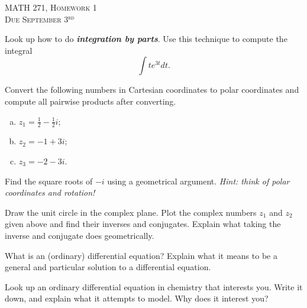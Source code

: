 \documentclass[12pt]{article} %
\begin{document}
\begin{center}
   \textsc{\large MATH 271, Homework 1}\\
   \textsc{Due September 3$^\textrm{rd}$}
\end{center}
\vspace{.5cm}

\begin{problem}
    Look up how to do \textbf{\emph{integration by parts}}. Use this technique to compute the integral
    \[
        \int t e^{3t}dt.
    \]
    
\end{problem}

\begin{problem}
Convert the following numbers in Cartesian coordinates to polar coordinates and compute all pairwise products after converting.
\begin{enumerate}[(a)]
    \item $z_1=\frac{1}{2}-\frac{1}{2}i$;
    \item $z_2=-1+3i$;
    \item $z_3=-2-3i$.
\end{enumerate}
\end{problem}

\begin{problem}
Find the square roots of $-i$ using a geometrical argument. \emph{Hint: think of polar coordinates and rotation!}
\end{problem}

\begin{problem}
Draw the unit circle in the complex plane. Plot the complex numbers $z_1$ and $z_2$ given above and find their inverses and conjugates. Explain what taking the inverse and conjugate does geometrically.
\end{problem}

\begin{problem}
    What is an (ordinary) differential equation? Explain what it means to be a general and particular solution to a differential equation.
\end{problem}

\begin{problem}
    Look up an ordinary differential equation in chemistry that interests you.  Write it down, and explain what it attempts to model. Why does it interest you?
\end{problem}
\end{document}
